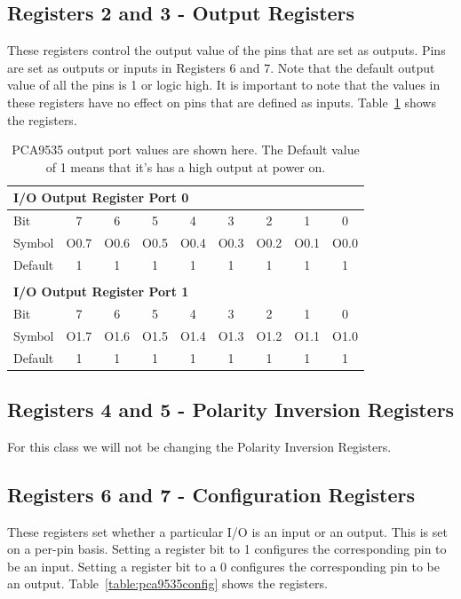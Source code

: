 \subsection{Registers 2 and 3 - Output Registers}
These registers control the output value of the pins that are set as outputs. Pins are set
as outputs or inputs in Registers 6 and 7. Note that the default output value of all the 
pins is 1 or logic high. It is important to note that the values in these registers have 
no effect on pins that are defined as inputs. Table~\ref{table:pca9535outputports} shows 
the registers.

\begin{table}[!htb]
	\centering
	\begin{tabular}{l c c c c c c c c}
        \multicolumn{5}{l}{\textbf{I/O Output Register Port 0}} \\
		\hline
		Bit & 7 & 6 & 5 & 4 & 3 & 2 & 1 & 0 \\
		\hline
        Symbol & O0.7 & O0.6 & O0.5 & O0.4 & O0.3 & O0.2 & O0.1 & O0.0\\
        Default & 1 & 1 & 1 & 1 & 1 & 1 & 1 & 1 \\
        \hline
        \\
        \multicolumn{5}{l}{\textbf{I/O Output Register Port 1}} \\
		\hline
		Bit & 7 & 6 & 5 & 4 & 3 & 2 & 1 & 0 \\
		\hline
        Symbol & O1.7 & O1.6 & O1.5 & O1.4 & O1.3 & O1.2 & O1.1 & O1.0\\
        Default & 1 & 1 & 1 & 1 & 1 & 1 & 1 & 1 \\
        \hline
	\end{tabular}
	\caption{PCA9535 output port values are shown here. The Default value of 1 means 
    that it's has a high output at power on.}
	\label{table:pca9535outputports}
\end{table}

\subsection{Registers 4 and 5 - Polarity Inversion Registers}
For this class we will not be changing the Polarity Inversion Registers. 

\subsection{Registers 6 and 7 - Configuration Registers}
These registers set whether a particular I/O is an input or an output. This is set 
on a per-pin basis. Setting a register bit to 1 configures the corresponding pin to 
be an input. Setting a register bit to a 0 configures the corresponding pin to be 
an output. Table~\ref{table:pca9535config} shows the registers.

